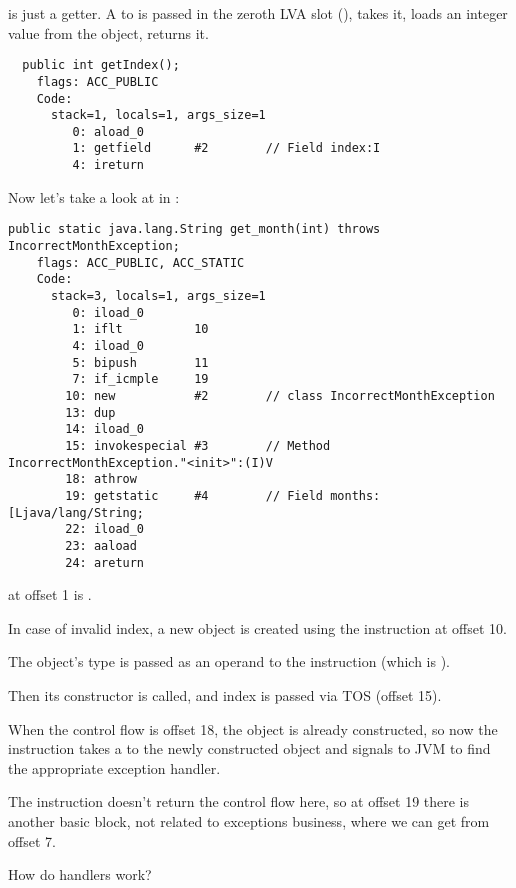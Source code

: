  is just a getter.
A  to  is passed in the zeroth \ac{LVA} slot
(),  takes it,  loads an integer value from the object, 
 returns it.

\begin{lstlisting}
  public int getIndex();
    flags: ACC_PUBLIC
    Code:
      stack=1, locals=1, args_size=1
         0: aload_0       
         1: getfield      #2        // Field index:I
         4: ireturn       
\end{lstlisting}

Now let's take a look at  in :

\begin{lstlisting}[caption=Month2.class]
  public static java.lang.String get_month(int) throws IncorrectMonthException;
    flags: ACC_PUBLIC, ACC_STATIC
    Code:
      stack=3, locals=1, args_size=1
         0: iload_0       
         1: iflt          10
         4: iload_0       
         5: bipush        11
         7: if_icmple     19
        10: new           #2        // class IncorrectMonthException
        13: dup           
        14: iload_0       
        15: invokespecial #3        // Method IncorrectMonthException."<init>":(I)V
        18: athrow        
        19: getstatic     #4        // Field months:[Ljava/lang/String;
        22: iload_0       
        23: aaload        
        24: areturn       
\end{lstlisting}

 at offset 1 is .

In case of invalid index, a new object is created using the  instruction at offset 10.

The object's type is passed as an operand to the instruction (which is ).

Then its constructor is called, and index is passed via \ac{TOS} (offset 15).

When the control flow is offset 18, the object is already constructed, 
so now the  instruction takes a  
to the newly constructed object and signals to \ac{JVM} to find the appropriate exception handler.

The  instruction doesn't return the control flow here, 
so at offset 19 there is another \gls{basic block},
not related to exceptions business, where we can get from offset 7.

How do handlers work?

